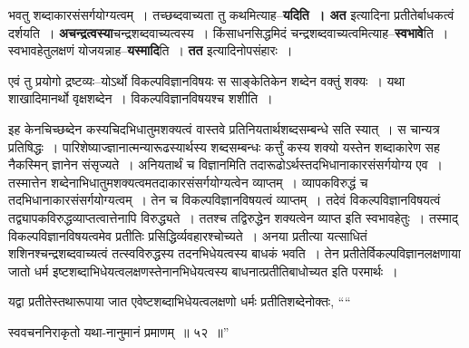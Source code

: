 \documentclass[article,12pt,a4paper]{memoir}
\begin{document}
	  \pstart भवतु शब्दाकारसंसर्गयोग्यत्वम् । तच्छब्दवाच्यता तु कथमित्याह--\textbf{यदिति । अत} इत्यादिना प्रतीतेर्बाधकत्वं दर्शयति । \textbf{अचन्द्रत्वस्या}चन्द्रशब्दवाच्यत्वस्य । किंसाधनसिद्धमिदं चन्द्रशब्दवाच्यत्वमित्याह--\textbf{स्वभावे}ति । स्वभावहेतुलक्षणं योजयन्नाह--\textbf{यस्मादि}ति । \textbf{तत} इत्यादिनोपसंहारः ।
	\pend
      

	  \pstart एवं तु प्रयोगो द्रष्टव्यः--योऽर्थो विकल्पविज्ञानविषयः स साङ्केतिकेन शब्देन वक्तुं शक्यः । यथा शाखादिमानर्थो वृक्षशब्देन । विकल्पविज्ञानविषयश्च शशीति ।
	\pend
      

	  \pstart इह केनचिच्छब्देन कस्यचिदभिधातुमशक्यत्वं वास्तवे प्रतिनियतार्थशब्दसम्बन्धे सति स्यात् । स चान्यत्र प्रतिषिद्धः । पारिशेष्याज्ज्ञानात्मन्यारूढस्यार्थस्य शब्दसम्बन्धः कर्त्तुं कस्य शक्यो यस्तेन शब्दाकारेण सह नैकस्मिन् ज्ञानेन संसृज्यते । अनियतार्थं च विज्ञानमिति तदारूढोऽर्थस्तदभिधानाकारसंसर्गयोग्य एव । तस्मात्तेन शब्देनाभिधातुमशक्यत्वमतदाकारसंसर्गयोग्यत्वेन व्याप्तम् । व्या\leavevmode{}पकविरुद्धं च तदभिधानाकारसंसर्गयोग्यत्वम् । तेन च विकल्पविज्ञानविषयत्वं व्याप्तम् । तदेवं विकल्पविज्ञानविषयत्वं तद्व्यापकविरुद्धव्याप्तत्वात्तेनापि विरुद्ध्यते । ततश्च तद्विरुद्धेन शक्यत्वेन व्याप्त इति स्वभावहेतुः । तस्माद् विकल्पविज्ञानविषयत्वमेव प्रतीतिः प्रसिद्धिर्व्यवहारश्चोच्यते । अनया प्रतीत्या यत्साधितं शशिनश्चन्द्रशब्दवाच्यत्वं तत्स्वविरुद्धस्य तदनभिधेयत्वस्य बाधकं भवति । तेन प्रतीतेर्विकल्पविज्ञानलक्षणाया जातो धर्म इष्टशब्दाभिधेयत्वलक्षणस्तेनानभिधेयत्वस्य बाधनात्प्रतीतिबाधोच्यत इति परमार्थः ।
	\pend
      

	  \pstart यद्वा प्रतीतेस्तथारूपाया जात एवेष्टशब्दाभिधेयत्वलक्षणो धर्मः प्रतीतिशब्देनोक्तः,  \leavevmode{} ““
	  
	स्ववचननिराकृतो यथा-नानुमानं प्रमाणम् ॥ ५२ ॥” 
	  
\end{document}
